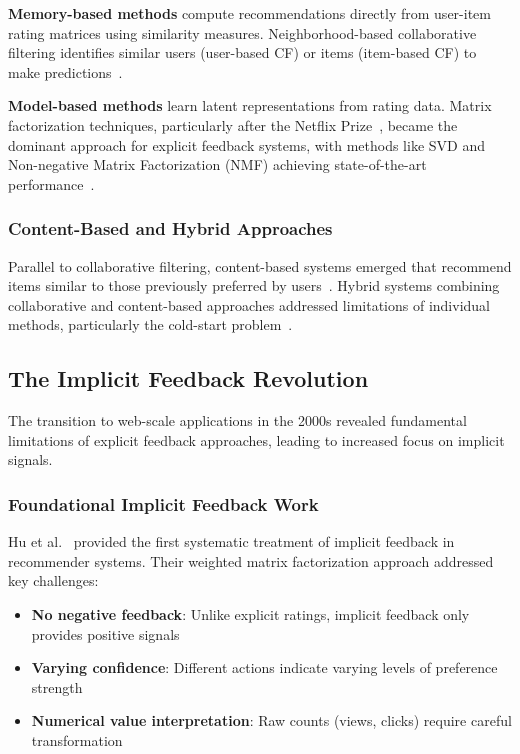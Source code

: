 \textbf{Memory-based methods} compute recommendations directly from user-item rating matrices using similarity measures. Neighborhood-based collaborative filtering identifies similar users (user-based CF) or items (item-based CF) to make predictions~\cite{herlocker1999algorithmic,sarwar2001item}.

\textbf{Model-based methods} learn latent representations from rating data. Matrix factorization techniques, particularly after the Netflix Prize~\cite{bennett2007netflix}, became the dominant approach for explicit feedback systems, with methods like SVD and Non-negative Matrix Factorization (NMF) achieving state-of-the-art performance~\cite{koren2009matrix,lee1999learning}.

\subsubsection{Content-Based and Hybrid Approaches}
Parallel to collaborative filtering, content-based systems emerged that recommend items similar to those previously preferred by users~\cite{pazzani2007content}. Hybrid systems combining collaborative and content-based approaches addressed limitations of individual methods, particularly the cold-start problem~\cite{burke2002hybrid,adomavicius2005toward}.

\subsection{The Implicit Feedback Revolution}

The transition to web-scale applications in the 2000s revealed fundamental limitations of explicit feedback approaches, leading to increased focus on implicit signals.

\subsubsection{Foundational Implicit Feedback Work}
Hu et al.~\cite{hu2008collaborative} provided the first systematic treatment of implicit feedback in recommender systems. Their weighted matrix factorization approach addressed key challenges:
\begin{itemize}
    \item \textbf{No negative feedback}: Unlike explicit ratings, implicit feedback only provides positive signals
    \item \textbf{Varying confidence}: Different actions indicate varying levels of preference strength
    \item \textbf{Numerical value interpretation}: Raw counts (views, clicks) require careful transformation
\end{itemize}

